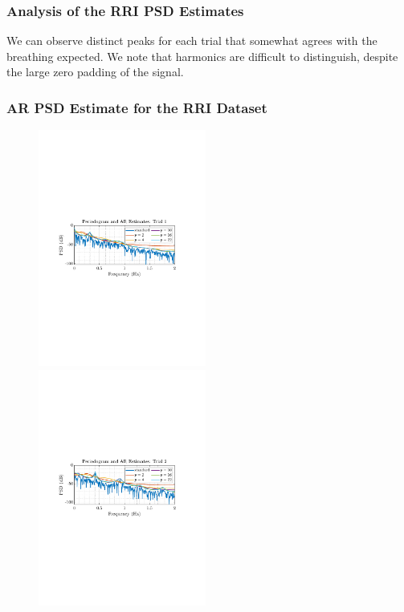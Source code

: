 \documentclass[12pt]{article}
\begin{document}
	\subsubsection{Analysis of the RRI PSD Estimates}
	
	We can observe distinct peaks for each trial that somewhat agrees with the breathing expected. We note that harmonics are difficult to distinguish, despite the large zero padding of the signal.
	\pagebreak
	
	\subsubsection{AR PSD Estimate for the RRI Dataset}
	
	\begin{figure}
		\vspace{-20pt}
		\begin{centering}
			\includegraphics[trim={2.2cm 11.2cm 3.15cm  11.2cm}, clip, width=0.49\textwidth]{../MATLAB/figures/q1_5c_fig01.pdf} 
		\end{centering}
		\begin{centering}
			\includegraphics[trim={2.2cm 11.2cm 3.15cm  11.2cm}, clip, width=0.49\textwidth]{../MATLAB/figures/q1_5c_fig02.pdf} 

\end{centering}
\end{figure}
\end{document}
